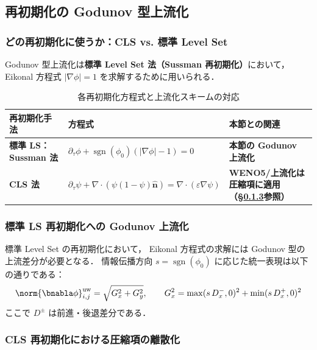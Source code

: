 \subsection{再初期化の Godunov 型上流化}
\label{sec:godunov}

\subsubsection{どの再初期化に使うか：CLS vs. 標準 Level Set}

Godunov 型上流化は\textbf{標準 Level Set 法（Sussman 再初期化）}において，
Eikonal 方程式 $|\nabla\phi| = 1$ を求解するために用いられる．

\begin{table}[htbp]
\centering
\caption{各再初期化方程式と上流化スキームの対応}
\renewcommand{\arraystretch}{1.3}
\begin{tabular}{>{\raggedright\arraybackslash}p{40mm}>{\raggedright\arraybackslash}p{55mm}>{\raggedright\arraybackslash}p{38mm}}
\hline
再初期化手法 & 方程式 & 本節との関連 \\
\hline
\textbf{標準 LS：Sussman 法} & \small$\partial_\tau\phi + \operatorname{sgn}(\phi_0)(|\nabla\phi|-1) = 0$ & \textbf{本節の Godunov 上流化} \\[4pt]
\textbf{CLS 法} & \small$\partial_\tau\psi + \nabla\cdot(\psi(1{-}\psi)\hat{\bm{n}}) = \nabla\cdot(\varepsilon\nabla\psi)$ & \textbf{WENO5/上流化は圧縮項に適用（§\ref{sec:cls_compression}参照）} \\
\hline
\end{tabular}
\end{table}

\subsubsection{標準 LS 再初期化への Godunov 上流化}

標準 Level Set の再初期化において，
Eikonal 方程式の求解には Godunov 型の上流差分が必要となる．
情報伝播方向 $s=\operatorname{sgn}(\phi_0)$ に応じた統一表現は以下の通りである：
\begin{equation}
 \norm{\bnabla\phi}^{\mathrm{uw}}_{i,j}=
 \sqrt{G_x^2+G_y^2},\qquad G_x^2=\max(s\,D_x^-,0)^2+\min(s\,D_x^+,0)^2
 \label{eq:godunov_upwind}
\end{equation}
ここで $D^\pm$ は前進・後退差分である．

\subsubsection{CLS 再初期化における圧縮項の離散化}
\label{sec:cls_compression}

